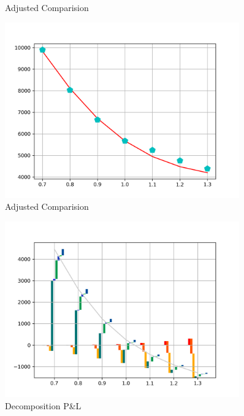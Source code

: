 \documentclass[12pt]{article}
\begin{document}
\begin{figure}
\caption{Adjusted Comparision} 
 \end{figure}\begin{figure} 
\includegraphics[width=0.9\textwidth]{task41.png} 
\caption{Adjusted Comparision} 
 \end{figure}\begin{figure} 
\includegraphics[width=0.9\textwidth]{task42.png} 
\caption{Decomposition P\&L} 
 \end{figure}
\end{document}
